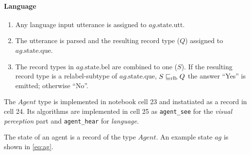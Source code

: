 \paragraph{Language}

\begin{enumerate}
\item Any language input utterance is assigned to $ag.\text{state.utt}$.
\item The utterance is parsed and the resulting record type ($Q$) assigned to $ag.\text{state.que}$.
\item The record types in $ag.\text{state.bel}$ are combined to one ($S$).
If the resulting record type is a relabel-subtype of $ag.\text{state.que}$, $S \mathrel{\sqsubseteq_\text{rlb}} Q$ the answer ``Yes'' is emitted; otherwise ``No''.
\end{enumerate}

The $Agent$ type is implemented in notebook cell 23 and instatiated as a record in cell 24.
Its algorithms are implemented in cell 25 as \texttt{agent\_see} for the \textit{visual perception} part and \texttt{agent\_hear} for \textit{language}.

The state of an agent is a record of the type $Agent$.
An example state $ag$ is shown in \autoref{eq:ag}.

